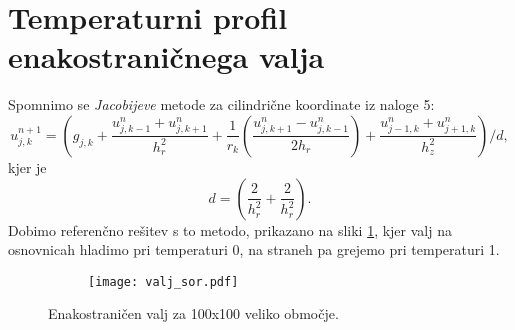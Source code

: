 \documentclass[12pt,a4paper]{article}
\begin{document}
\section*{Temperaturni profil enakostraničnega valja}


Spomnimo se \textit{Jacobijeve} metode za cilindrične koordinate iz naloge 5:
\begin{equation}\label{eq:enacba6}
u_{j,k}^{n+1}=\left( g_{j,k} + \frac{u_{j,k-1}^{n} + u_{j,k+1}^{n}}{h_r ^{2}} + \frac{1}{r_k}\left(  \frac{u_{j,k+1}^{n} - u_{j,k-1}^{n}}{2h_r}\right) + \frac{u_{j-1,k}^{n} + u_{j+1,k}^{n}}{h_z ^{2}}\right)/d,
\end{equation}
kjer je
\begin{equation*}
d=\left( 
\frac{2}{h_r^{2}}+ \frac{2}{h_r ^{2}}  \right).
\end{equation*}
Dobimo referenčno rešitev s to metodo, prikazano na sliki \ref{fig:slika11}, kjer valj na osnovnicah hladimo pri temperaturi 0, na straneh pa grejemo pri temperaturi 1.

\begin{figure}[H]
    \centering
    \begin{subfigure}[b]{0.5\textwidth}  			
        \texttt{[image: valj\_sor.pdf]}
    \end{subfigure}
    \caption{Enakostraničen valj za 100x100 veliko območje.} \label{fig:slika11}
\end{figure}
\end{document}
